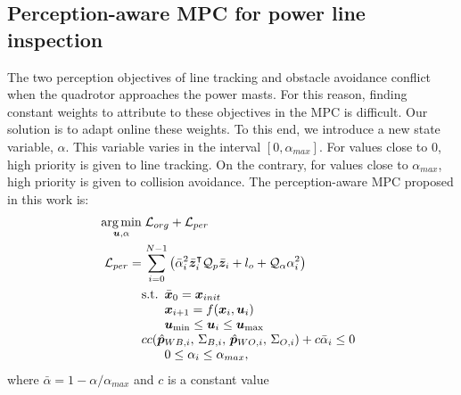 \subsection{Perception-aware MPC for power line inspection}\label{sec:perception_aware_mpc}
The two perception objectives of line tracking and obstacle avoidance conflict when the quadrotor approaches the power masts. For this reason, finding constant weights to attribute to these objectives in the MPC is difficult. Our solution is to adapt online these weights. To this end, we introduce a new state variable, $\alpha$. This variable varies in the interval $[0, \alpha_{max}]$. For values close to 0, high priority is given to line tracking. On the contrary, for values close to $\alpha_{max}$, high priority is given to collision avoidance. The perception-aware MPC proposed in this work is:
\begin{equation}
		\begin{aligned}
\argmin_{\bm{u}, \alpha}& \; \mathcal{L}_{org}+\mathcal{L}_{per} \\
			\mathcal{L}_{per} =&\,  \sum_{i=0}^{N-1} \left(
			\bar{\alpha}_i^2 \bar{\bm{z} }_{i}^\intercal \mathcal{Q}_{p} \bar{\bm{z} }_{i} +
			l_{o} +\mathcal{Q}_{\alpha} \alpha_i^2\right) \\
			 &\text{s.t.}  
			\begin{array}[t]{l}
				\bar{\bm{x}}_0 = \bm{x}_{init}\\
				\bm{x}_{i+1} = f(\bm{x}_i, \bm{u}_i)\\
				\bm{u}_{\textrm{min}} \leq  \bm{u}_i\leq\bm{u}_{\textrm{max}} \\
				\hspace{-0.65cm}cc\!\left(\hat{\bm{p}}_{WB, i}, \, \Sigma_{B,i}, \, \hat{\bm{p}}_{WO, i}, \, \Sigma_{O,i} \right) + c \bar{\alpha}_i \leq 0 \\
				0 \leq \alpha_i \leq \alpha_{max},
			\end{array}
	\end{aligned}\label{eq:perception_aware_mpc}
\end{equation}
where $\bar{\alpha} = 1 - \alpha/\alpha_{max}$ and $c$ is a constant value 

